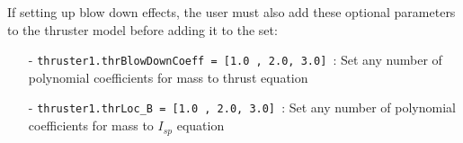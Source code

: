 If setting up blow down effects, the user must also add these optional parameters to the thruster model before adding it to the set:

\begin{itemize}
  \item[-]   \texttt{thruster1.thrBlowDownCoeff = [1.0 , 2.0, 3.0] }: Set any number of polynomial coefficients for mass to thrust equation
  \item[-]   \texttt{thruster1.thrLoc\_B = [1.0 , 2.0, 3.0] }: Set any number of polynomial coefficients for mass to $I_{sp}$ equation
\end{itemize}
